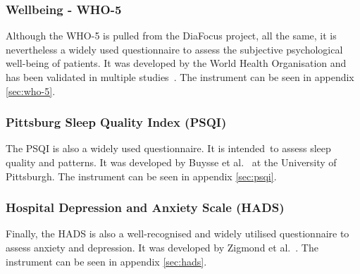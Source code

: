 \subsubsection*{Wellbeing - WHO-5}
Although the WHO-5 is pulled from the DiaFocus project, all the same, it is nevertheless a widely used questionnaire to assess the subjective psychological well-being of patients. It was developed by the World Health Organisation and has been validated in multiple studies~\cite{WHO5}. The instrument can be seen in appendix \autoref{sec:who-5}.

\subsubsection*{Pittsburg Sleep Quality Index (PSQI)}
The PSQI is also a widely used questionnaire. It is intended to assess sleep quality and patterns. It was developed by Buysse et al.~\cite{PSQI} at the University of Pittsburgh. The instrument can be seen in appendix \autoref{sec:psqi}.

\subsubsection*{Hospital Depression and Anxiety Scale (HADS)}
Finally, the HADS is also a well-recognised and widely utilised questionnaire to assess anxiety and depression. It was developed by Zigmond et al.~\cite{HADS}. The instrument can be seen in appendix \autoref{sec:hads}.


